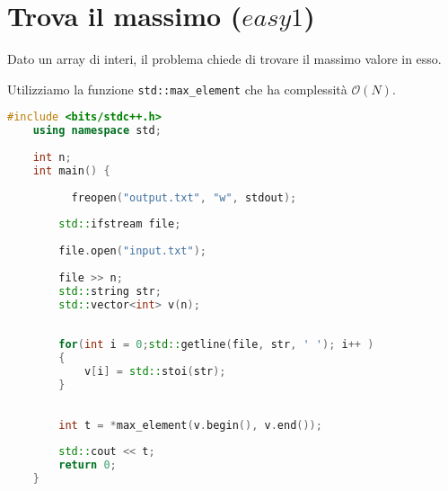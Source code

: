 \documentclass{report}
\newcommand{\code}[1]{\texttt{#1}}
\begin{document}
\section*{Trova il massimo ($easy1$)}
Dato un array di interi, il problema chiede di trovare il massimo valore in esso.

\begin{tcolorbox}[colback=lightlightblue,colframe=lightblue, , coltitle=black, title=Soluzione in $\mathcal{O}(N)$]
    Utilizziamo la funzione \code{std::max\_element} che ha complessità $\mathcal{O}(N)$.
\end{tcolorbox}

\begin{lstlisting}[language=c++]
    #include <bits/stdc++.h>
    using namespace std;
    
    int n;
    int main() {
    
          freopen("output.txt", "w", stdout);
    
        std::ifstream file;
    
        file.open("input.txt");
    
        file >> n;
        std::string str;
        std::vector<int> v(n);
        
    
        for(int i = 0;std::getline(file, str, ' '); i++ )
        {
            v[i] = std::stoi(str);
        }
        
    
        int t = *max_element(v.begin(), v.end());
    
        std::cout << t;
        return 0;
    }
\end{lstlisting}
\end{document}
